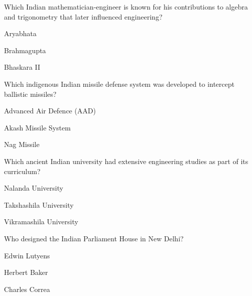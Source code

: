 \begin{enhancedmcq}{Which Indian mathematician‑engineer is known for his contributions to algebra and trigonometry that later influenced engineering?}
\item Aryabhata
\item Brahmagupta
\item Bhaskara II

\end{enhancedmcq}
\begin{enhancedmcq}{Which indigenous Indian missile defense system was developed to intercept ballistic missiles?}
\item Advanced Air Defence (AAD)
\item Akash Missile System
\item Nag Missile

\end{enhancedmcq}
\begin{enhancedmcq}{Which ancient Indian university had extensive engineering studies as part of its curriculum?}
\item Nalanda University
\item Takshashila University
\item Vikramashila University

\end{enhancedmcq}
\begin{enhancedmcq}{Who designed the Indian Parliament House in New Delhi?}
\item Edwin Lutyens
\item Herbert Baker
\item Charles Correa
\end{enhancedmcq}